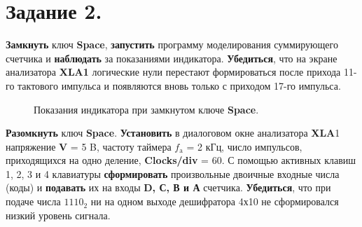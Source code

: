 \documentclass[spec, och, otchet, hidelinks]{SCWorks}
\begin{document}
\newpage

\section*{Задание 2.}

\textbf{Замкнуть} ключ \textbf{Space}, \textbf{запустить} программу моделирования суммирующего счетчика и \textbf{наблюдать} за показаниями индикатора.
\textbf{Убедиться}, что на экране анализатора \textbf{XLA1} логические нули перестают формироваться после прихода 11-го тактового импульса и появляются 
вновь только с приходом 17-го импульса.

\begin{figure}[h]
	\caption{Показания индикатора при замкнутом ключе \textbf{Space}.}
\end{figure}

\newpage

\textbf{Разомкнуть} ключ \textbf{Space}. \textbf{Установить} в диалоговом окне анализатора \textbf{XLA}1 напряжение \textbf{V} = 5 B, частоту таймера 
$ f_\text{a} $ = 2 кГц, число импульсов, приходящихся на одно деление, \textbf{Clocks/div} = 60. С помощью активных клавиш 1, 2, 3 и 4 клавиатуры 
\textbf{сформировать} произвольные двоичные входные числа (коды) и \textbf{подавать} их на входы \textbf{D, С, В и А} счетчика. \textbf{Убедиться}, 
что при подаче числа $ 1110_2 $ ни на одном выходе дешифратора 4х10 не сформировался низкий уровень сигнала. 
\end{document}
